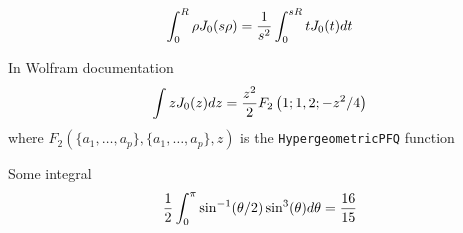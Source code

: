 \documentclass[11pt]{amsart}
\begin{document}
\begin{equation}
\int_0^R \rho J_0(s\rho) = {1\over s^2}\int_0^{sR}t J_0(t) dt
\end{equation}

In Wolfram documentation
\begin{equation}
\int z J_0(z) dz = {z^2\over 2} F_2\left( 1; 1,2;-z^2/4\right)
\end{equation}
where $F_2(\{a_1,\dots,a_p\}, \{a_1,\dots,a_p\}, z)$ is the \verb|HypergeometricPFQ| function

Some integral
\begin{equation*}
{1\over 2}\int_0^\pi \sin^{-1}(\theta/2)\sin^3(\theta)d\theta = \frac{16}{15}
\end{equation*}





%

\end{document}
